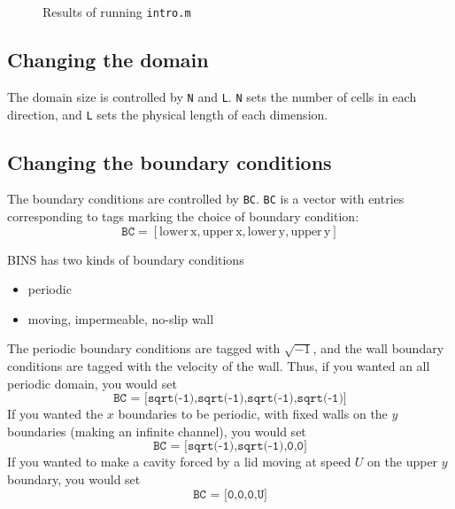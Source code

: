 \documentclass[12pt]{article}
\begin{document}
\begin{center}
\begin{figure*}
\center
{}  
\caption{Results of running \texttt{intro.m}}
\label{vel_init}
\end{figure*}
\end{center}

\subsection{Changing the domain}
The domain size is controlled by \texttt{N} and \texttt{L}.  \texttt{N} sets the number of cells in each direction, and \texttt{L} sets the physical length of each dimension.

\subsection{Changing the boundary conditions}
The boundary conditions are controlled by \texttt{BC}.  \texttt{BC} is a vector with entries corresponding to tags marking the choice of boundary condition:
\[ \texttt{BC} = [\mathrm{lower \hspace{2pt} x, upper\hspace{2pt} x, lower\hspace{2pt} y, upper\hspace{2pt} y} ]\]

BINS has two kinds of boundary conditions
\begin{itemize}
\item periodic
\item moving, impermeable, no-slip wall
\end{itemize}

The periodic boundary conditions are tagged with $\sqrt{-1}$, and the wall boundary conditions are tagged with the velocity of the wall.  Thus, if you wanted an all periodic domain, you would set
\[ \texttt{BC = [sqrt(-1),sqrt(-1),sqrt(-1),sqrt(-1)]}\]
If you wanted the $x$ boundaries to be periodic, with fixed walls on the $y$ boundaries (making an infinite channel), you would set
\[ \texttt{BC = [sqrt(-1),sqrt(-1),0,0]}\]
If you wanted to make a cavity forced by a lid moving at speed $U$ on the upper $y$ boundary, you would set
\[ \texttt{BC = [0,0,0,U]}\]
\end{document}
